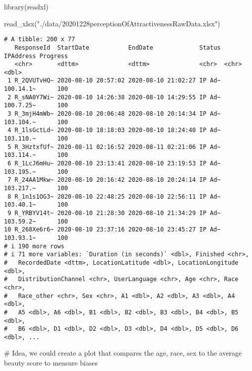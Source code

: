 \documentclass[
  letterpaper,
  DIV=11,
  numbers=noendperiod]{scrartcl}
\newenvironment{Shaded}{\begin{snugshade}}{\end{snugshade}}
\newcommand{\CommentTok}[1]{\textcolor[rgb]{0.37,0.37,0.37}{#1}}
\newcommand{\FunctionTok}[1]{\textcolor[rgb]{0.28,0.35,0.67}{#1}}
\newcommand{\NormalTok}[1]{\textcolor[rgb]{0.00,0.23,0.31}{#1}}
\newcommand{\StringTok}[1]{\textcolor[rgb]{0.13,0.47,0.30}{#1}}
\begin{document}
\begin{Shaded}
\begin{Highlighting}[]
\FunctionTok{library}\NormalTok{(readxl)}
\end{Highlighting}
\end{Shaded}

\begin{Shaded}
\begin{Highlighting}[]
\FunctionTok{read\_xlsx}\NormalTok{(}\StringTok{"./data/20201228perceptionOfAttractivenessRawData.xlsx"}\NormalTok{)}
\end{Highlighting}
\end{Shaded}

\begin{verbatim}
# A tibble: 200 x 77
   ResponseId  StartDate           EndDate             Status IPAddress Progress
   <chr>       <dttm>              <dttm>              <chr>  <chr>        <dbl>
 1 R_2QVUTvHQ~ 2020-08-10 20:57:02 2020-08-10 21:02:27 IP Ad~ 100.14.1~      100
 2 R_sNA0Y7Wi~ 2020-08-10 14:26:38 2020-08-10 14:29:55 IP Ad~ 100.7.25~      100
 3 R_3mjH4mWb~ 2020-08-10 20:06:48 2020-08-10 20:14:34 IP Ad~ 103.104.~      100
 4 R_1lsGctLd~ 2020-08-10 18:18:03 2020-08-10 18:24:40 IP Ad~ 103.110.~      100
 5 R_3HztxfUf~ 2020-08-11 02:16:52 2020-08-11 02:21:06 IP Ad~ 103.114.~      100
 6 R_1LcJ6mHu~ 2020-08-10 23:13:41 2020-08-10 23:19:53 IP Ad~ 103.195.~      100
 7 R_24AA1Mkw~ 2020-08-10 20:16:42 2020-08-10 20:24:14 IP Ad~ 103.217.~      100
 8 R_1n1s1OG3~ 2020-08-10 22:48:25 2020-08-10 22:56:11 IP Ad~ 103.40.1~      100
 9 R_YRBYV14t~ 2020-08-10 21:28:30 2020-08-10 21:34:29 IP Ad~ 103.59.2~      100
10 R_268Xe6r6~ 2020-08-10 23:37:16 2020-08-10 23:45:27 IP Ad~ 103.93.1~      100
# i 190 more rows
# i 71 more variables: `Duration (in seconds)` <dbl>, Finished <chr>,
#   RecordedDate <dttm>, LocationLatitude <dbl>, LocationLongitude <dbl>,
#   DistributionChannel <chr>, UserLanguage <chr>, Age <chr>, Race <chr>,
#   Race_other <chr>, Sex <chr>, A1 <dbl>, A2 <dbl>, A3 <dbl>, A4 <dbl>,
#   A5 <dbl>, A6 <dbl>, B1 <dbl>, B2 <dbl>, B3 <dbl>, B4 <dbl>, B5 <dbl>,
#   B6 <dbl>, D1 <dbl>, D2 <dbl>, D3 <dbl>, D4 <dbl>, D5 <dbl>, D6 <dbl>, ...
\end{verbatim}

\begin{Shaded}
\begin{Highlighting}[]
\CommentTok{\# Idea, we could create a plot that compares the age, race, sex to the average beauty score to measure biases}
\end{Highlighting}
\end{Shaded}
\end{document}

